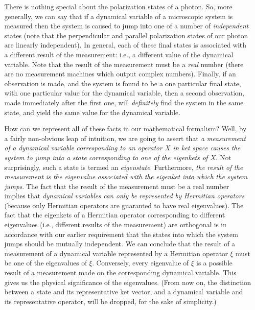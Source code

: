 There is nothing special about the polarization states of a photon. So, more
generally, we can say that if  a dynamical variable of
a microscopic system is measured then the  system is caused to jump into one of a number of
{\em independent}\/ states (note that the perpendicular and parallel polarization
states of our photon are linearly independent). In general, each of these final states
is associated with a different result of the measurement:
{\rm i.e.}, a different value of the dynamical variable. Note that the result
of the measurement must be a {\em real}\/ number (there are no measurement machines
which output complex numbers). Finally, if an observation is made, and the system
is found to be a one particular final state, with one particular value for the
dynamical variable, then a second observation, made immediately after the first one,
will {\em definitely}\/ find the system in the same state, and yield the same
value for the dynamical variable.

How can we represent all of these facts in our mathematical formalism? Well,
by a fairly non-obvious leap of intuition, we are going to assert that
{\em a measurement of a dynamical variable corresponding to an operator $X$ in ket
space causes the system to jump into a state corresponding to one of the
eigenkets of $X$}. Not surprisingly, such a state is termed an {\em eigenstate}. 
Furthermore,
 {\em the result of the measurement is the eigenvalue associated with the eigenket
into which the system jumps}. The fact that the result of the measurement must
be a real number implies that {\em dynamical variables can only be represented
by Hermitian operators}\/ (because only Hermitian operators are guaranted to have
real eigenvalues). The fact that the eigenkets of a Hermitian operator
corresponding to different eigenvalues ({\rm i.e.}, different results of the
measurement) are orthogonal is in accordance with our earlier requirement that the
states into which the system jumps should be mutually independent. 
We can conclude that the result of  a measurement of a dynamical variable
represented by a Hermitian operator $\xi$ must be one of the eigenvalues
of $\xi$. Conversely, every eigenvalue of $\xi$ is a possible result
of a measurement made on the corresponding dynamical variable. This gives
us the physical significance of the eigenvalues. (From now on, the distinction
between a state and its representative ket vector, and a dynamical variable
and its representative operator, will be dropped, for the sake of
simplicity.)


